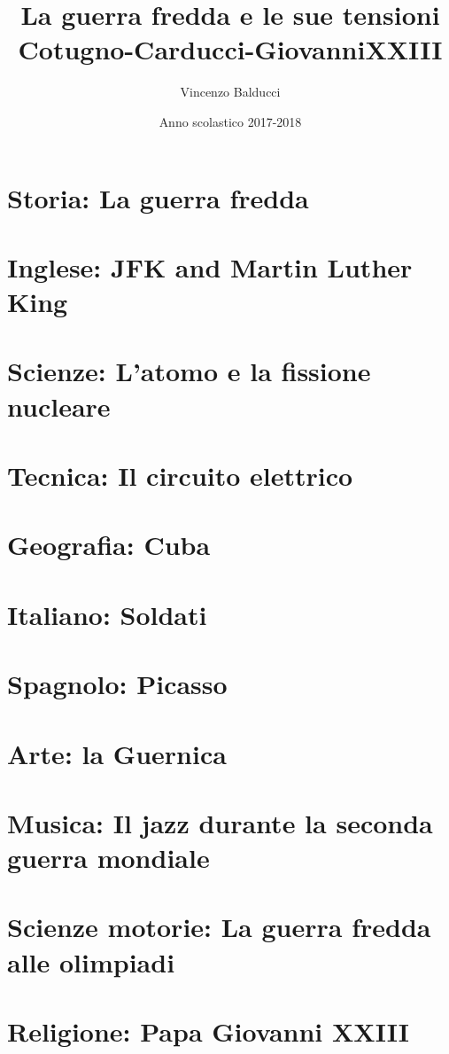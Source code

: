 \documentclass[14pt]{report}
\title{
  {La guerra fredda e le sue tensioni}\\
  {\large Cotugno-Carducci-GiovanniXXIII}
}
\author{Vincenzo Balducci}
\date{Anno scolastico 2017-2018}
\begin{document}
\maketitle

\tableofcontents

\chapter{Storia: La guerra fredda}


\chapter{Inglese: JFK and Martin Luther King}


\chapter{Scienze: L'atomo e la fissione nucleare}


\chapter{Tecnica: Il circuito elettrico}


\chapter{Geografia: Cuba}


\chapter{Italiano: Soldati}


\chapter{Spagnolo: Picasso}


\chapter{Arte: la Guernica}


\chapter{Musica: Il jazz durante la seconda guerra mondiale}


\chapter{Scienze motorie: La guerra fredda alle olimpiadi}


\chapter{Religione: Papa Giovanni XXIII}

\end{document}
